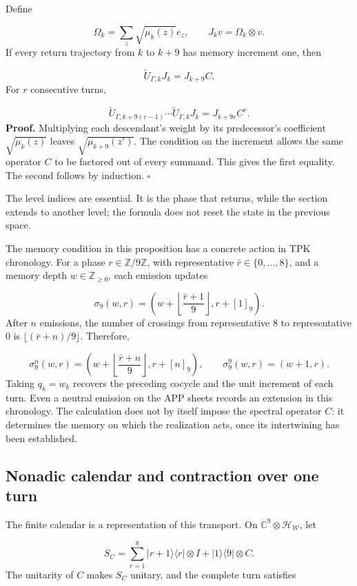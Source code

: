 Define

\[
\Omega_k=\sum_z\sqrt{\mu_k(z)}e_z,\qquad
J_kv=\Omega_k\otimes v.
\]
If every return trajectory from \(k\) to \(k+9\) has memory increment one, then

\[
\widetilde U_{\Gamma,k}J_k=J_{k+9}C.
\]
For \(r\) consecutive turns,

\[
\widetilde U_{\Gamma,k+9(r-1)}\cdots
\widetilde U_{\Gamma,k}J_k=J_{k+9r}C^r.
\]
\textbf{Proof.} Multiplying each descendant's weight by its predecessor's coefficient \(\sqrt{\mu_k(z)}\) leaves \(\sqrt{\mu_{k+9}(z')}\). The condition on the increment allows the same operator \(C\) to be factored out of every summand. This gives the first equality. The second follows by induction. \hfill\(\square\)

The level indices are essential. It is the phase that returns, while the section extends to another level; the formula does not reset the state in the previous space.

The memory condition in this proposition has a concrete action in TPK chronology. For a phase \(r\in\mathbb Z/9\mathbb Z\), with representative \(\bar r\in\{0,\ldots,8\}\), and a memory depth \(w\in\mathbb Z_{\geq0}\), each emission updates

\[
\sigma_9(w,r)=
\left(w+\left\lfloor\frac{\bar r+1}{9}\right\rfloor,r+[1]_9\right).
\]
After \(n\) emissions, the number of crossings from representative \(8\) to representative \(0\) is \(\lfloor(\bar r+n)/9\rfloor\). Therefore,

\[
\sigma_9^n(w,r)=
\left(w+\left\lfloor\frac{\bar r+n}{9}\right\rfloor,r+[n]_9\right),
\qquad
\sigma_9^9(w,r)=(w+1,r).
\]
Taking \(q_k=w_k\) recovers the preceding cocycle and the unit increment of each turn. Even a neutral emission on the APP sheets records an extension in this chronology. The calculation does not by itself impose the spectral operator \(C\): it determines the memory on which the realization acts, once its intertwining has been established.

\subsection{Nonadic calendar and contraction over one turn}
\label{rz:calendario}
The finite calendar is a representation of this transport. On \(\mathbb C^9\otimes\mathcal H_{\mathscr W}\), let

\[
S_C=\sum_{r=1}^{8}|r+1\rangle\langle r|\otimes I
+|1\rangle\langle9|\otimes C.
\]
The unitarity of \(C\) makes \(S_C\) unitary, and the complete turn satisfies

